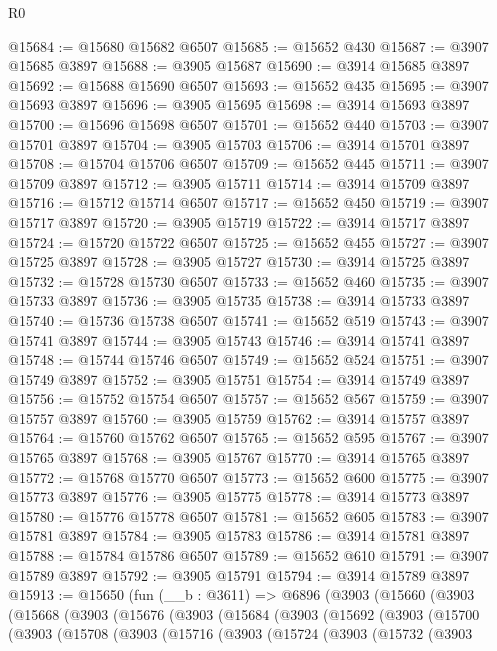 \begin{lexlean}{R0}
\begin{coremodule}
@15684 := @15680 @15682 @6507
@15685 := @15652 @430
@15687 := @3907 @15685 @3897
@15688 := @3905 @15687
@15690 := @3914 @15685 @3897
@15692 := @15688 @15690 @6507
@15693 := @15652 @435
@15695 := @3907 @15693 @3897
@15696 := @3905 @15695
@15698 := @3914 @15693 @3897
@15700 := @15696 @15698 @6507
@15701 := @15652 @440
@15703 := @3907 @15701 @3897
@15704 := @3905 @15703
@15706 := @3914 @15701 @3897
@15708 := @15704 @15706 @6507
@15709 := @15652 @445
@15711 := @3907 @15709 @3897
@15712 := @3905 @15711
@15714 := @3914 @15709 @3897
@15716 := @15712 @15714 @6507
@15717 := @15652 @450
@15719 := @3907 @15717 @3897
@15720 := @3905 @15719
@15722 := @3914 @15717 @3897
@15724 := @15720 @15722 @6507
@15725 := @15652 @455
@15727 := @3907 @15725 @3897
@15728 := @3905 @15727
@15730 := @3914 @15725 @3897
@15732 := @15728 @15730 @6507
@15733 := @15652 @460
@15735 := @3907 @15733 @3897
@15736 := @3905 @15735
@15738 := @3914 @15733 @3897
@15740 := @15736 @15738 @6507
@15741 := @15652 @519
@15743 := @3907 @15741 @3897
@15744 := @3905 @15743
@15746 := @3914 @15741 @3897
@15748 := @15744 @15746 @6507
@15749 := @15652 @524
@15751 := @3907 @15749 @3897
@15752 := @3905 @15751
@15754 := @3914 @15749 @3897
@15756 := @15752 @15754 @6507
@15757 := @15652 @567
@15759 := @3907 @15757 @3897
@15760 := @3905 @15759
@15762 := @3914 @15757 @3897
@15764 := @15760 @15762 @6507
@15765 := @15652 @595
@15767 := @3907 @15765 @3897
@15768 := @3905 @15767
@15770 := @3914 @15765 @3897
@15772 := @15768 @15770 @6507
@15773 := @15652 @600
@15775 := @3907 @15773 @3897
@15776 := @3905 @15775
@15778 := @3914 @15773 @3897
@15780 := @15776 @15778 @6507
@15781 := @15652 @605
@15783 := @3907 @15781 @3897
@15784 := @3905 @15783
@15786 := @3914 @15781 @3897
@15788 := @15784 @15786 @6507
@15789 := @15652 @610
@15791 := @3907 @15789 @3897
@15792 := @3905 @15791
@15794 := @3914 @15789 @3897
@15913 := @15650
    (fun (__b : @3611) =>
    @6896
      (@3903
        (@15660
          (@3903
            (@15668
              (@3903
                (@15676
                  (@3903
                    (@15684
                      (@3903
                        (@15692
                          (@3903
                            (@15700
                              (@3903
                                (@15708
                                  (@3903
                                    (@15716
                                      (@3903
                                        (@15724
                                          (@3903
                                            (@15732
                                              (@3903

\end{coremodule}
\end{lexlean}
